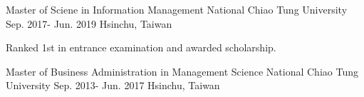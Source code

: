 

\begin{cventries}

  \cventry
    {Master of Sciene in Information Management} %
    {National Chiao Tung University} %
    {Sep. 2017- Jun. 2019} %
    {Hsinchu, Taiwan} %
    {
      \begin{cvitems} %
        \item {Ranked 1st in entrance examination and awarded scholarship.}
      \end{cvitems}
    }

  \cventry
    {Master of Business Administration in Management Science} %
    {National Chiao Tung University} %
    {Sep. 2013- Jun. 2017} %
    {Hsinchu, Taiwan} %
    {
    }

\end{cventries}